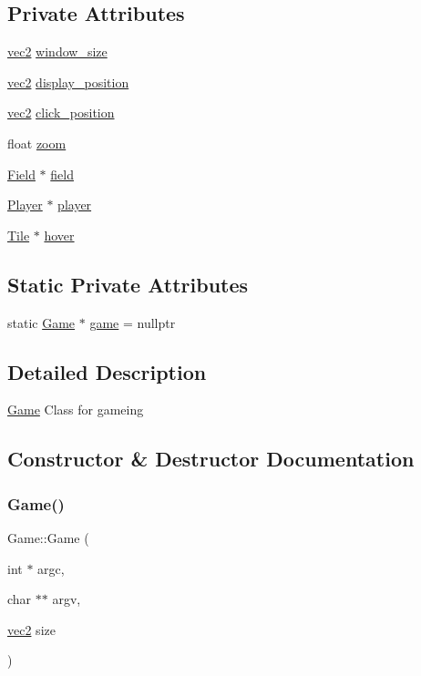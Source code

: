 \subsection*{Private Attributes}
\begin{DoxyCompactItemize}
\item 
\hyperlink{structvec2}{vec2} \hyperlink{classGame_abdc173d73c899329b1f3ed21b59508ee}{window\+\_\+size}
\item 
\hyperlink{structvec2}{vec2} \hyperlink{classGame_a1a2c78dbc5097d8ee63f1765c35b2410}{display\+\_\+position}
\item 
\hyperlink{structvec2}{vec2} \hyperlink{classGame_a42ff0c2859d65daadc20b3369f2233b0}{click\+\_\+position}
\item 
float \hyperlink{classGame_acf74ecf2e7981d8abe668305a77af96a}{zoom}
\item 
\hyperlink{classField}{Field} $\ast$ \hyperlink{classGame_a3cae3709d3d57b9f128e3eb98c84ba32}{field}
\item 
\hyperlink{classPlayer}{Player} $\ast$ \hyperlink{classGame_abec70aa1c0269a9a7e171af4d79e08bf}{player}
\item 
\hyperlink{classTile}{Tile} $\ast$ \hyperlink{classGame_aa71eaba68ed3622567950659638b997e}{hover}
\end{DoxyCompactItemize}
\subsection*{Static Private Attributes}
\begin{DoxyCompactItemize}
\item 
static \hyperlink{classGame}{Game} $\ast$ \hyperlink{classGame_ab652813f5a3cffb0ef4bfd08345b99ce}{game} = nullptr
\end{DoxyCompactItemize}


\subsection{Detailed Description}
\hyperlink{classGame}{Game} Class for gameing 

\subsection{Constructor \& Destructor Documentation}
\mbox{\label{classGame_a9d6d7d14009e53d647a16ff1523d8639}} 
\subsubsection{\texorpdfstring{Game()}{Game()}\hspace{0.1cm}{\footnotesize\ttfamily [1/2]}}
{\footnotesize\ttfamily Game\+::\+Game (\begin{DoxyParamCaption}\item[{int $\ast$}]{argc,  }\item[{char $\ast$$\ast$}]{argv,  }\item[{\hyperlink{structvec2}{vec2}}]{size }\end{DoxyParamCaption})\hspace{0.3cm}{\ttfamily [private]}}

